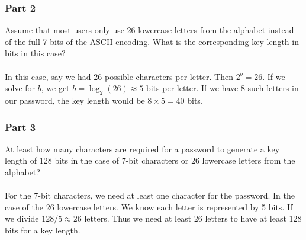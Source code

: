 \documentclass[titlepage]{article}
\begin{document}
{{\subsubsection{Part 2}
{
Assume that most users only use 26 lowercase letters from the alphabet instead of the full 7 bits of the ASCII-encoding. What is the corresponding key length in bits in this case?\\\\
In this case, say we had 26 possible characters per letter. Then \(2^b = 26\). If we solve for \(b\), we get \(b = \log_2(26) \approx 5\) bits per letter. If we have 8 such letters in our password, the key length would be \(8 \times 5 = 40\) bits.  
}
\subsubsection{Part 3}
{
At least how many characters are required for a password to generate a key length of 128 bits in the case of 7-bit characters or 26 lowercase letters from the alphabet?\\\\
For the 7-bit characters, we need at least one character for the password. In the case of the 26 lowercase letters. We know each letter is represented by 5 bits. If we divide \(128 / 5 \approx 26\) letters. Thus we need at least 26 letters to have at least 128 bits for a key length.
}
}
\clearpage
}
\end{document}
